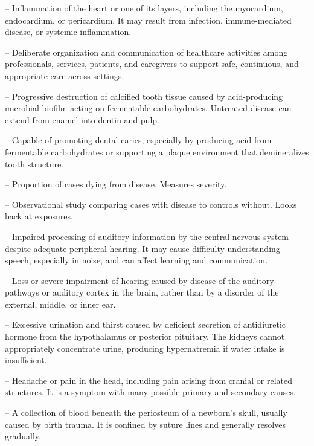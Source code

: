 -- Inflammation of the heart or one of its layers, including the myocardium, endocardium, or pericardium. It may result from infection, immune-mediated disease, or systemic inflammation.

-- Deliberate organization and communication of healthcare activities among professionals, services, patients, and caregivers to support safe, continuous, and appropriate care across settings.

-- Progressive destruction of calcified tooth tissue caused by acid-producing microbial biofilm acting on fermentable carbohydrates. Untreated disease can extend from enamel into dentin and pulp.

-- Capable of promoting dental caries, especially by producing acid from fermentable carbohydrates or supporting a plaque environment that demineralizes tooth structure.

-- Proportion of cases dying from disease. Measures severity.

-- Observational study comparing cases with disease to controls without. Looks back at exposures.

-- Impaired processing of auditory information by the central nervous system despite adequate peripheral hearing. It may cause difficulty understanding speech, especially in noise, and can affect learning and communication.

-- Loss or severe impairment of hearing caused by disease of the auditory pathways or auditory cortex in the brain, rather than by a disorder of the external, middle, or inner ear.

-- Excessive urination and thirst caused by deficient secretion of antidiuretic hormone from the hypothalamus or posterior pituitary. The kidneys cannot appropriately concentrate urine, producing hypernatremia if water intake is insufficient.

-- Headache or pain in the head, including pain arising from cranial or related structures. It is a symptom with many possible primary and secondary causes.

-- A collection of blood beneath the periosteum of a newborn's skull, usually caused by birth trauma. It is confined by suture lines and generally resolves gradually.

